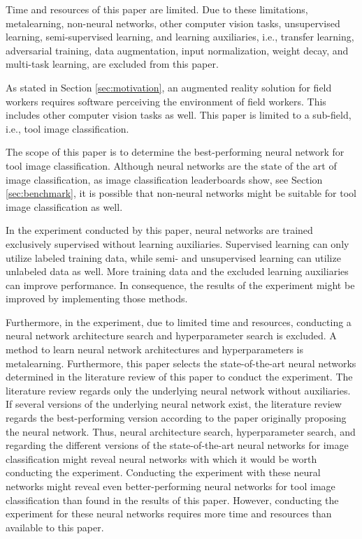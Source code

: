 Time and resources of this paper are limited. Due to these limitations, metalearning, non-neural networks, other computer vision tasks, unsupervised learning, semi-supervised learning, and learning auxiliaries, i.e., transfer learning, adversarial training, data augmentation, input normalization,  weight decay, and multi-task learning, are excluded from this paper.
\par%
As stated in Section \ref{sec:motivation}, an augmented reality solution for field workers requires software perceiving the environment of field workers. This includes other computer vision tasks as well. This paper is limited to a sub-field, i.e., tool image classification.
\par%
The scope of this paper is to determine the best-performing neural network for tool image classification. Although neural networks are the state of the art of image classification, as image classification leaderboards show, see Section \ref{sec:benchmark}, it is possible that non-neural networks might be suitable for tool image classification as well.
\par%
In the experiment conducted by this paper, neural networks are trained exclusively supervised without learning auxiliaries. Supervised learning can only utilize labeled training data, while semi- and unsupervised learning can utilize unlabeled data as well. More training data and the excluded learning auxiliaries can improve performance. \autocites{Pan.2010}{Szegedy.2014}{ElAmir.2020} In consequence, the results of the experiment might be improved by implementing those methods.
\par%
Furthermore, in the experiment, due to limited time and resources, conducting a neural network architecture search and hyperparameter search is excluded. A method to learn neural network architectures and hyperparameters is metalearning. \autocite{Schaul.2010} Furthermore, this paper selects the state-of-the-art neural networks determined in the literature review of this paper to conduct the experiment. The literature review regards only the underlying neural network without auxiliaries. If several versions of the underlying neural network exist, the literature review regards the best-performing version according to the paper originally proposing the neural network. Thus, neural architecture search, hyperparameter search, and regarding the different versions of the state-of-the-art neural networks for image classification might reveal neural networks with which it would be worth conducting the experiment. Conducting the experiment with these neural networks might reveal even better-performing neural networks for tool image classification than found in the results of this paper. However, conducting the experiment for these neural networks requires more time and resources than available to this paper.
